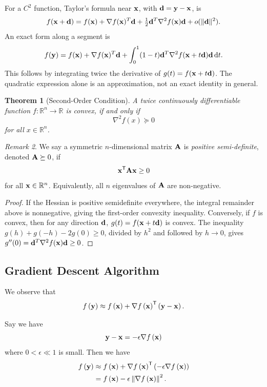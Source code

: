 \documentclass[11pt]{article}
\newtheorem{theorem}{Theorem}[section]
\theoremstyle{definition}
\theoremstyle{remark}
\newtheorem{remark}[theorem]{Remark}
\newcommand{\pqty}[1]{\left(#1\right)}
\newcommand{\functiondomain}[3]{#1:#2\to #3}
\newcommand{\RR}{\mathbb{R}}
\newcommand{\transpose}{^{\mathsf{T}}}
\newcommand{\grad}{\nabla}
\newcommand{\posDefEq}{\succeq}
\begin{document}
For a \(C^2\) function, Taylor's formula near \(\vb{x}\), with \(\vb{d}=\vb{y}-\vb{x}\), is
\[
f(\vb{x}+\vb{d})=f(\vb{x})+\grad f(\vb{x})^T\vb{d}
+\tfrac12\vb{d}^T\grad^2 f(\vb{x})\vb{d}+o(\|\vb{d}\|^2).
\]
An exact form along a segment is
\[
f(\vb{y})=f(\vb{x})+\grad f(\vb{x})^T\vb{d}
+\int_0^1(1-t)\vb{d}^T\grad^2 f(\vb{x}+t\vb{d})\vb{d}\,\mathrm{d}t.
\]
This follows by integrating twice the derivative of \(g(t)=f(\vb{x}+t\vb{d})\).
The quadratic expression alone is an approximation, not an exact identity in general.

\begin{theorem}[Second-Order Condition]\label{optim-unit-0008}
    \label{thm:second-order-condition}%
    A twice continuously differentiable function \(\functiondomain{f}{\RR^n}{\RR}\) is convex, if and only if
    \[
        \grad^2 f\pqty{x} \posDefEq 0
    \]
    for all \(x \in \RR^n\).
\end{theorem}

\begin{remark}\label{optim-unit-0009}
    We say a symmetric \(n\)-dimensional matrix \(\vb{A}\) is \emph{positive semi-definite}, denoted \(\vb{A} \posDefEq 0\), if
    \[
        \vb{x}\transpose \vb{A} \vb{x} \geq 0
    \]
    for all \(\vb{x} \in \RR^n\). Equivalently, all \(n\) eigenvalues of \(\vb{A}\) are non-negative.
\end{remark}

\begin{proof}
If the Hessian is positive semidefinite everywhere, the integral remainder above is
nonnegative, giving the first-order convexity inequality. Conversely, if \(f\) is
convex, then for any direction \(\vb{d}\), \(g(t)=f(\vb{x}+t\vb{d})\) is convex.
The inequality \(g(h)+g(-h)-2g(0)\ge0\), divided by \(h^2\) and followed by
\(h\to0\), gives \(g''(0)=\vb{d}^T\grad^2f(\vb{x})\vb{d}\ge0\).
\end{proof}

\subsection{Gradient Descent Algorithm}

We observe that
\[
    f\pqty{\vb{y}} \approx f\pqty{\vb{x}} + \grad f\pqty{\vb{x}} \transpose \pqty{\vb{y} - \vb{x}}.
\]

Say we have
\[
    \vb{y} - \vb{x} = - \epsilon \grad f\pqty{\vb{x}}
\]
where \(0 < \epsilon \ll 1\) is small. Then we have
\begin{align*}
    f\pqty{\vb{y}} &\approx f\pqty{\vb{x}} + \grad f\pqty{\vb{x}} \transpose \pqty{- \epsilon \grad f \pqty{\vb{x}}} \\
    &= f\pqty{\vb{x}} - \epsilon \norm{\grad f\pqty{\vb{x}}}^2.
\end{align*}
\end{document}
